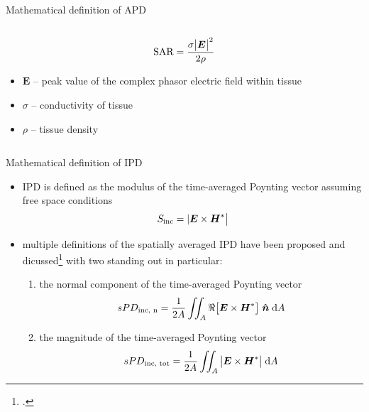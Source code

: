 \documentclass[xcolor=dvipsnames,10pt]{beamer}
\begin{document}
\begin{frame}{Mathematical definition of APD}
\begin{columns}[c]
\begin{column}{0.6\textwidth}
\begin{onlyenv}
\begin{equation*}
                    \centering
                    \text{SAR} = \frac{\sigma \big| \boldsymbol{E} \big|^2}{2\rho}
                \end{equation*}
                \begin{itemize}
                    \item $\boldsymbol{E}$ -- peak value of the complex phasor electric field within tissue
                    \item $\sigma$ -- conductivity of tissue
                    \item $\rho$ -- tissue density 
                \end{itemize}
            \end{onlyenv}
        \end{column}
    \end{columns}
\end{frame}

\begin{frame}{Mathematical definition of IPD}
    \begin{itemize}
        \item IPD is defined as the modulus of the time-averaged Poynting vector assuming free space conditions
        \begin{equation*}
            \centering
            S_\text{inc} = |\boldsymbol{E} \times \boldsymbol{H}^* \big|
        \end{equation*}
        \item multiple definitions of the spatially averaged IPD have been proposed and dicussed\footcite{IEEE2021Guide} with two standing out in particular:
        \begin{enumerate}
            \item the normal component of the time-averaged Poynting vector
            \begin{equation*}
                \centering
                sPD_\text{inc, n} = \frac{1}{2A} \iint_{A} \Re \big[\boldsymbol{E} \times \boldsymbol{H}^* \big] \; \boldsymbol{\hat n} \; \mathrm{d}A
            \end{equation*}
            \item the magnitude of the time-averaged Poynting vector
            \begin{equation*}
                \centering
                sPD_\text{inc, tot} = \frac{1}{2A} \iint_{A} \big| \boldsymbol{E} \times \boldsymbol{H}^* \big|\; \mathrm{d}A
            \end{equation*}
        \end{enumerate}
    \end{itemize}
\end{frame}
\end{document}
